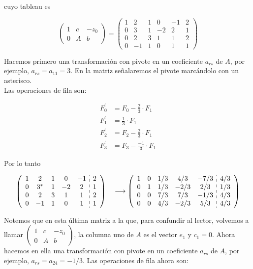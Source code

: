 \documentclass[10pt]{article}
\begin{document}
cuyo tableau es

$$
\left(\begin{array}{cc|c}
1 & c & -z_{0} \\
0 & A & b
\end{array}\right)=\left(\begin{array}{ccccc|c}
1 & 2 & 1 & 0 & -1 & 2 \\
0 & 3 & 1 & -2 & 2 & 1 \\
0 & 2 & 3 & 1 & 1 & 2 \\
0 & -1 & 1 & 0 & 1 & 1
\end{array}\right)
$$

Hacemos primero una transformación con pivote en un coeficiente $a_{r s}$ de $A$, por ejemplo, $a_{r s}=a_{11}=3$. En la matriz señalaremos el pivote marcándolo con un asterisco.\\
Las operaciones de fila son:

$$
\begin{aligned}
F_{0}^{\prime} & =F_{0}-\frac{2}{3} \cdot F_{1} \\
F_{1}^{\prime} & =\frac{1}{3} \cdot F_{1} \\
F_{2}^{\prime} & =F_{2}-\frac{2}{3} \cdot F_{1} \\
F_{3}^{\prime} & =F_{3}-\frac{-1}{3} \cdot F_{1}
\end{aligned}
$$

Por lo tanto

$$
\left(\begin{array}{ccccc:c}
1 & 2 & 1 & 0 & -1 & 2 \\
0 & 3^{*} & 1 & -2 & 2 & 1 \\
0 & 2 & 3 & 1 & 1 & 2 \\
0 & -1 & 1 & 0 & 1 & 1
\end{array}\right) \quad \longrightarrow\left(\begin{array}{ccccc:c}
1 & 0 & 1 / 3 & 4 / 3 & -7 / 3 & 4 / 3 \\
0 & 1 & 1 / 3 & -2 / 3 & 2 / 3 & 1 / 3 \\
0 & 0 & 7 / 3 & 7 / 3 & -1 / 3 & 4 / 3 \\
0 & 0 & 4 / 3 & -2 / 3 & 5 / 3 & 4 / 3
\end{array}\right)
$$

Notemos que en esta última matriz a la que, para confundir al lector, volvemos a llamar $\left(\begin{array}{cc|c}1 & c & -z_{0} \\ 0 & A & b\end{array}\right)$, la columna uno de $A$ es el vector $e_{1}$ y $c_{1}=0$. Ahora hacemos en ella una transformación con pivote en un coeficiente $a_{r s}$ de $A$, por ejemplo, $a_{r s}=a_{24}=-1 / 3$. Las operaciones de fila ahora son:
\end{document}
